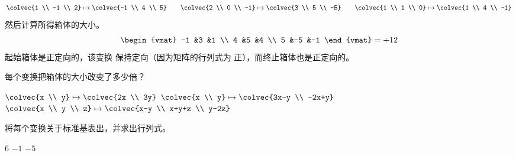 \begin{exercises}
\begin{answer}
\begin{exparts}
\begin{equation*}
            \colvec{1 \\ -1 \\ 2}\mapsto\colvec{-1 \\ 4 \\ 5}
            \qquad
            \colvec{2 \\ 0 \\ -1}\mapsto\colvec{3 \\ 5 \\ -5}
            \qquad
            \colvec{1 \\ 1 \\ 0}\mapsto\colvec{1 \\ 4 \\ -1}
          \end{equation*}
          然后计算所得箱体的大小。
          \begin{equation*}
            \begin{vmat}
              -1 &3  &1 \\
               4 &5  &4 \\
               5 &-5 &-1
            \end{vmat}
            =+12
          \end{equation*}
          起始箱体是正定向的，该变换
          保持定向（因为矩阵的行列式为
          正），而终止箱体也是正定向的。
      \end{exparts}
    \end{answer}
  \item 
    每个变换把箱体的大小改变了多少倍？
    \begin{exparts*}
      \partsitem $\colvec{x \\ y}\mapsto\colvec{2x \\ 3y}$
      \partsitem $\colvec{x \\ y}\mapsto\colvec{3x-y \\ -2x+y}$
      \partsitem $\colvec{x \\ y \\ z}\mapsto\colvec{x-y \\ x+y+z \\ y-2z}$
    \end{exparts*}
    \begin{answer}
      将每个变换关于标准基表出，并求出行列式。
      \begin{exparts*}
        \partsitem $6$
        \partsitem $-1$
        \partsitem $-5$
      \end{exparts*}
    \end{answer}
  \item 

\end{exercises}
